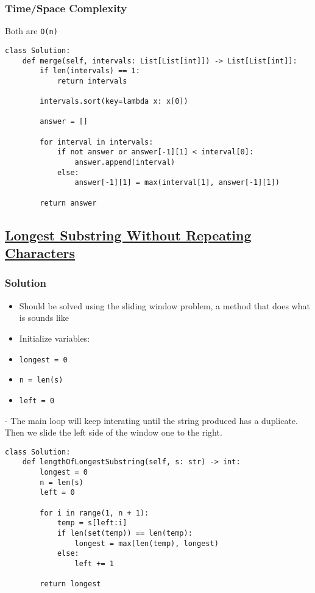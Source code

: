 \documentclass{article}
\begin{document}
\subsubsection{Time/Space Complexity}
Both are \lstinline{O(n)}

\begin{lstlisting}
class Solution:
    def merge(self, intervals: List[List[int]]) -> List[List[int]]:
        if len(intervals) == 1:
            return intervals

        intervals.sort(key=lambda x: x[0])
        
        answer = []
        
        for interval in intervals:
            if not answer or answer[-1][1] < interval[0]:
                answer.append(interval)
            else:
                answer[-1][1] = max(interval[1], answer[-1][1])
                
        return answer
\end{lstlisting}

\subsection{\href{https://leetcode.com/problems/longest-substring-without-repeating-characters/description/?envType=company&envId=amazon&favoriteSlug=amazon-thirty-days}{Longest Substring Without Repeating Characters}}

\subsubsection{Solution}
\begin{itemize}
\item Should be solved using the sliding window problem, a method that does what is sounds like
\item Initialize variables:
\item \lstinline{longest = 0}
\item \lstinline{n = len(s)}
\item \lstinline{left = 0}
\end{itemize}
- The main loop will keep interating until the string produced has a duplicate. Then we slide the left side of the window one to the right.

\begin{lstlisting}
class Solution:
    def lengthOfLongestSubstring(self, s: str) -> int:
        longest = 0
        n = len(s)
        left = 0

        for i in range(1, n + 1):
            temp = s[left:i]
            if len(set(temp)) == len(temp):
                longest = max(len(temp), longest)
            else:
                left += 1

        return longest
\end{lstlisting}
\end{document}
